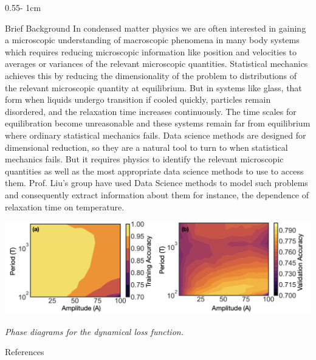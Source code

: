 \documentclass{../psuposter}
\begin{document}
\begin{frame}
\begin{columns}[t, totalwidth=\textwidth]
\begin{column}{0.55\textwidth - 1cm}
    \begin{block}{Brief Background}
In condensed matter physics we are often interested in gaining a microscopic understanding of macroscopic phenomena in many body systems which requires reducing microscopic information like position and velocities to averages or variances of the relevant microscopic quantities. Statistical mechanics achieves this by reducing the dimensionality of the problem to distributions of the relevant microscopic quantity at equilibrium. But in systems like glass, that form when liquids undergo transition if cooled quickly, particles remain disordered, and the relaxation time increases continuously. The time scales for equilibration become unreasonable and these systems remain far from equilibrium where ordinary statistical mechanics fails. Data science methods are designed for dimensional reduction, so they are a natural tool to turn to when statistical mechanics fails. But it requires physics to identify the relevant microscopic quantities as well as the most appropriate data science methods to use to access them. Prof. Liu's group have used Data Science methods to model such problems and consequently extract information about them for instance, the dependence of relaxation time on temperature. \cite{schoenholzStructuralApproachRelaxation2016,cubukIdentifyingStructuralFlow2015}
        \begin{center}
		   	\includegraphics[width=1\textwidth]{images/background}    	
		   	

		\textit{Phase diagrams for the dynamical loss function. \cite{ruiz-garciaTiltingPlayingField2021}}	
    	\end{center}
    \end{block}


    \begin{block}{References}
    	\nocite{*}
        
%        
		
    \end{block}


\end{column}
\end{columns}
\end{frame}
\end{document}
